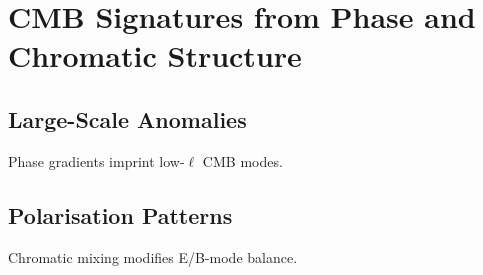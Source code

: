 \chapter{CMB Signatures from Phase and Chromatic Structure}

\section{Large-Scale Anomalies}
Phase gradients imprint low-\(\ell\) CMB modes.

\section{Polarisation Patterns}
Chromatic mixing modifies E/B-mode balance.

